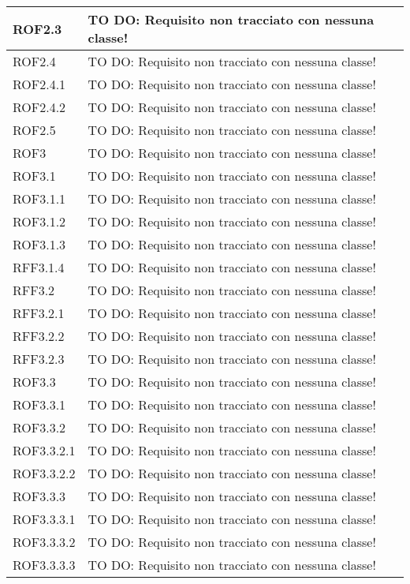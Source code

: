 \begin{center}
\begin{longtable}{| p{2.5cm} | p{11cm} |}
\hline
ROF2.3 & TO DO: Requisito non tracciato con nessuna classe! \\
\hline
ROF2.4 & TO DO: Requisito non tracciato con nessuna classe! \\
\hline
ROF2.4.1 & TO DO: Requisito non tracciato con nessuna classe! \\
\hline
ROF2.4.2 & TO DO: Requisito non tracciato con nessuna classe! \\
\hline
ROF2.5 & TO DO: Requisito non tracciato con nessuna classe! \\
\hline
ROF3 & TO DO: Requisito non tracciato con nessuna classe! \\
\hline
ROF3.1 & TO DO: Requisito non tracciato con nessuna classe! \\
\hline
ROF3.1.1 & TO DO: Requisito non tracciato con nessuna classe! \\
\hline
ROF3.1.2 & TO DO: Requisito non tracciato con nessuna classe! \\
\hline
ROF3.1.3 & TO DO: Requisito non tracciato con nessuna classe! \\
\hline
RFF3.1.4 & TO DO: Requisito non tracciato con nessuna classe! \\
\hline
RFF3.2 & TO DO: Requisito non tracciato con nessuna classe! \\
\hline
RFF3.2.1 & TO DO: Requisito non tracciato con nessuna classe! \\
\hline
RFF3.2.2 & TO DO: Requisito non tracciato con nessuna classe! \\
\hline
RFF3.2.3 & TO DO: Requisito non tracciato con nessuna classe! \\
\hline
ROF3.3 & TO DO: Requisito non tracciato con nessuna classe! \\
\hline
ROF3.3.1 & TO DO: Requisito non tracciato con nessuna classe! \\
\hline
ROF3.3.2 & TO DO: Requisito non tracciato con nessuna classe! \\
\hline
ROF3.3.2.1 & TO DO: Requisito non tracciato con nessuna classe! \\
\hline
ROF3.3.2.2 & TO DO: Requisito non tracciato con nessuna classe! \\
\hline
ROF3.3.3 & TO DO: Requisito non tracciato con nessuna classe! \\
\hline
ROF3.3.3.1 & TO DO: Requisito non tracciato con nessuna classe! \\
\hline
ROF3.3.3.2 & TO DO: Requisito non tracciato con nessuna classe! \\
\hline
ROF3.3.3.3 & TO DO: Requisito non tracciato con nessuna classe! \\

\end{longtable}
\end{center}
